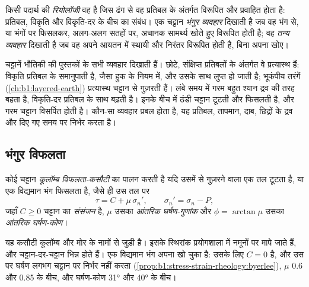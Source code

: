 \begin{definition}[रियोलॉजी, भंगुर और तन्य व्यवहार]
\label{def:b1:stress-strain-rheology:rheology}
किसी पदार्थ की \emph{रियोलॉजी} वह है जिस ढंग से वह प्रतिबल के अंतर्गत विरूपित और प्रवाहित होता है: प्रतिबल, विकृति और विकृति-दर के बीच का संबंध। एक चट्टान \emph{भंगुर व्यवहार} दिखाती है जब वह भंग से, या भंगों पर फिसलकर, अलग-अलग सतहों पर, अचानक सामर्थ्य खोते हुए विरूपित होती है; वह \emph{तन्य व्यवहार} दिखाती है जब वह अपने आयतन में स्थायी और निरंतर विरूपित होती है, बिना अपना  खोए।
\end{definition}

चट्टानें भौतिकी की पुस्तकों के सभी व्यवहार दिखाती हैं। छोटे, संक्षिप्त प्रतिबलों के अंतर्गत वे प्रत्यास्थ हैं: विकृति प्रतिबल के समानुपाती है, जैसा हुक के नियम में, और उसके साथ लुप्त हो जाती है; भूकंपीय तरंगें (\cref{ch:b1:layered-earth}) प्रत्यास्थ चट्टान से गुज़रती हैं। लंबे समय में गरम  बहुत श्यान द्रव की तरह बहता है, विकृति-दर प्रतिबल के साथ बढ़ती है। इनके बीच में ठंडी चट्टान टूटती और फिसलती है, और गरम चट्टान विसर्पित होती है। कौन-सा व्यवहार प्रबल होता है, यह प्रतिबल, तापमान, दाब, छिद्रों के द्रव और दिए गए समय पर निर्भर करता है।

\subsection*{भंगुर विफलता}

\begin{definition}[कूलॉम्ब विफलता-कसौटी]
\label{def:b1:stress-strain-rheology:coulomb}
कोई चट्टान \emph{कूलॉम्ब विफलता-कसौटी} का पालन करती है यदि उसमें से गुज़रने वाला एक तल टूटता है, या एक विद्यमान भंग फिसलता है, जैसे ही उस तल पर
\[
  \tau = C + \mu\,\sigma_n' , \qquad \sigma_n' = \sigma_n - P ,
\]
जहाँ $C \ge 0$ चट्टान का \emph{संसंजन} है, $\mu$ उसका \emph{आंतरिक घर्षण-गुणांक} और $\phi = \arctan\mu$ उसका \emph{आंतरिक घर्षण-कोण}।
\end{definition}

यह कसौटी कूलॉम्ब और मोर के नामों से जुड़ी है। इसके स्थिरांक प्रयोगशाला में नमूनों पर मापे जाते हैं, और चट्टान-दर-चट्टान भिन्न होते हैं। एक विद्यमान भंग अपना  खो चुका है: उसके लिए $C = 0$ है, और उस पर घर्षण लगभग चट्टान पर निर्भर नहीं करता (\cref{prop:b1:stress-strain-rheology:byerlee}), $\mu$ 0.6 और 0.85 के बीच, और घर्षण-कोण \ang{31} और \ang{40} के बीच।

